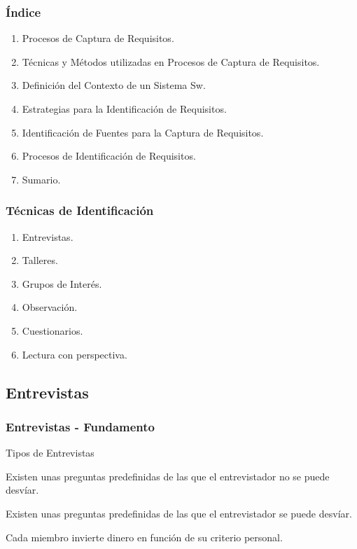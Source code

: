 ﻿\documentclass[handout,a4paper,slidestop,xcolor=pst,dvips,blue]{beamer}
\begin{document}
\begin{frame}[c]
    \frametitle{Índice}
    \begin{enumerate}
         \item Procesos de Captura de Requisitos.
         \item Técnicas y Métodos utilizadas en Procesos de Captura de Requisitos.
         \item Definición del Contexto de un Sistema Sw.
         \item \alert{Estrategias para la Identificación de Requisitos}.
         \item Identificación de Fuentes para la Captura de Requisitos.
         \item Procesos de Identificación de Requisitos.
         \item Sumario.
    \end{enumerate}
\end{frame}

\begin{frame}[c]
    \frametitle{Técnicas de Identificación}
    \begin{enumerate}
         \item \alert<2->{Entrevistas}.
         \item Talleres.
         \item Grupos de Interés.
         \item Observación.
         \item Cuestionarios.
         \item Lectura con perspectiva.
    \end{enumerate}
\end{frame}

\subsection{Entrevistas}

\begin{frame}[t]
    \frametitle{Entrevistas - Fundamento}
    \begin{block}{Tipos de Entrevistas}
        \begin{description}[<+->]
            \item[Estandarizada] Existen unas preguntas predefinidas de las que el entrevistador no se puede desvíar.
            \item[Exploratoria] Existen unas preguntas predefinidas de las que el entrevistador se puede desvíar.
            \item[No estructurada] Cada miembro invierte dinero en función de su criterio personal.
        \end{description}
    \end{block}
\end{frame}
\end{document}

